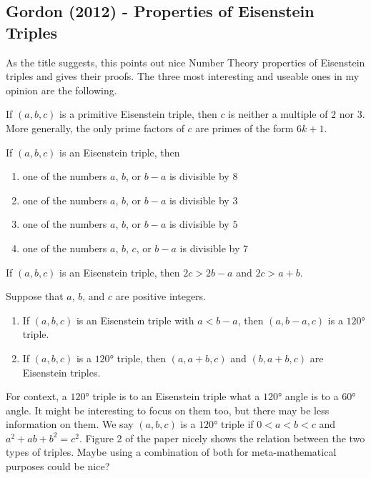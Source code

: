 \documentclass[12pt]{article}
\begin{document}
\subsection{Gordon (2012) - Properties of Eisenstein Triples}
As the title suggests, this points out nice Number Theory properties of Eisenstein triples and gives their proofs. The three most interesting and useable ones in my opinion are the following.
\begin{thm}{}{} %
    If $(a,b,c)$ is a primitive Eisenstein triple, then $c$ is neither a multiple of $2$ nor $3$. More generally, the only prime factors of $c$ are primes of the form $6k + 1$.
\end{thm}
\begin{thm}
If $(a,b,c)$ is an Eisenstein triple, then
\begin{enumerate}
    \item one of the numbers $a$, $b$, or $b-a$ is divisible by $8$
    \item one of the numbers $a$, $b$, or $b-a$ is divisible by $3$
    \item one of the numbers $a$, $b$, or $b-a$ is divisible by $5$
    \item one of the numbers $a$, $b$, $c$, or $b-a$ is divisible by $7$
\end{enumerate}
\end{thm}
\begin{thm}{}{}
    If $(a,b,c)$ is an Eisenstein triple, then $2c > 2b - a$ and $2c > a + b$.
\end{thm}
\begin{thm}{}{}
    Suppose that $a$, $b$, and $c$ are positive integers.
    \begin{enumerate}
        \item If $(a,b,c)$ is an Eisenstein triple with $a<b-a$, then $(a,b-a,c)$ is a $120$° triple.
        \item If $(a,b,c)$ is a $120$° triple, then $(a, a+b, c)$ and $(b,a+b,c)$ are Eisenstein triples.
    \end{enumerate}
\end{thm}
For context, a $120$° triple is to an Eisenstein triple what a $120$° angle is to a $60$° angle. It might be interesting to focus on them too, but there may be less information on them. We say $(a,b,c)$ is a $120$° triple if $0<a<b<c$ and $a^2 + ab + b^2 = c^2$. Figure 2 of the paper nicely shows the relation between the two types of triples. Maybe using a combination of both for meta-mathematical purposes could be nice?
\end{document}
